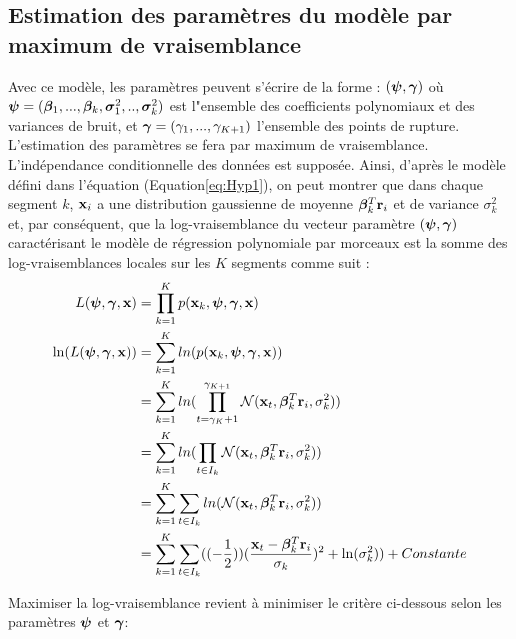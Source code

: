 \documentclass[12pt]{article}
\begin{document}
\subsection{Estimation des paramètres du modèle par maximum de vraisemblance}
\label{ssec: 2-2}
\smallbreak
Avec ce modèle, les paramètres peuvent s'écrire de la forme : $(\boldsymbol{\psi},\boldsymbol{\gamma})$ où  $\boldsymbol{\psi}=(\boldsymbol{\beta}_{1},...,\boldsymbol{\beta}_{k},\boldsymbol{\sigma}^2_{1},..,\boldsymbol{\sigma}^2_{k})$ est l"ensemble des coefficients polynomiaux et des variances de bruit, et $\boldsymbol{\gamma}=(\gamma_{1},...,\gamma_{K+1})$ l'ensemble des points de rupture. L'estimation des paramètres se fera par maximum de vraisemblance. L'indépendance conditionnelle des données est supposée. Ainsi, d'après le modèle défini dans l'équation  (Equation\ref{eq:Hyp1}), on peut montrer que dans chaque segment $k$, ${\mathbf{x}}_{i}$ a une distribution gaussienne de moyenne $\boldsymbol{\beta}^{T}_{k}\mathbf{r}_{i}$ et de variance $\sigma^2_{k}$ et, par conséquent, que la log-vraisemblance du vecteur paramètre $(\boldsymbol{\psi},\boldsymbol{\gamma})$ caractérisant le modèle de régression polynomiale par morceaux est la somme des log-vraisemblances locales sur les $K$ segments comme suit :
\begin{equation}
\begin{split}
 L(\boldsymbol{\psi},\boldsymbol{\gamma},{\mathbf{x}}) & = \prod_{k=1}^{K}p({\mathbf{x}}_{k},\boldsymbol{\psi},\boldsymbol{\gamma},{\mathbf{x}}) \\
\ln(L(\boldsymbol{\psi},\boldsymbol{\gamma},{\mathbf{x}})) & = \sum_{k=1}^{K} ln(p({\mathbf{x}}_{k},\boldsymbol{\psi},\boldsymbol{\gamma},{\mathbf{x}})) \\
&                  = \sum_{k=1}^{K} ln( \prod_{t=\gamma_{K}+1}^{\gamma_{K+1}}   \mathcal{N}({\mathbf{x}}_{t},\boldsymbol{\beta}^{T}_{k}\mathbf{r}_{i},\sigma^2_{k}))\\
&       			 = \sum_{k=1}^{K} ln( \prod_{t \in I_k}   \mathcal{N}({\mathbf{x}}_{t},\boldsymbol{\beta}^{T}_{k}\mathbf{r}_{i},\sigma^2_{k}))\\
&       			 = \sum_{k=1}^{K} \sum_{t \in I_k}  ln(  \mathcal{N}({\mathbf{x}}_{t},\boldsymbol{\beta}^{T}_{k}\mathbf{r}_{i},\sigma^2_{k}))\\
&       			 = \sum_{k=1}^{K} \sum_{t \in I_k}  ((-\frac{1}{2}))(\frac{{\mathbf{x}}_{t}-\boldsymbol{\beta}^{T}_{k}\mathbf{r}_{i}}{\sigma_{k}})^2 + \ln (\sigma^2_{k}))+Constante\\
\label{eq:Hyp2}
\end{split}
\end{equation}

Maximiser la log-vraisemblance revient à minimiser le critère ci-dessous selon les paramètres $\boldsymbol{\psi}$ et $\boldsymbol{\gamma}$:
\end{document}
